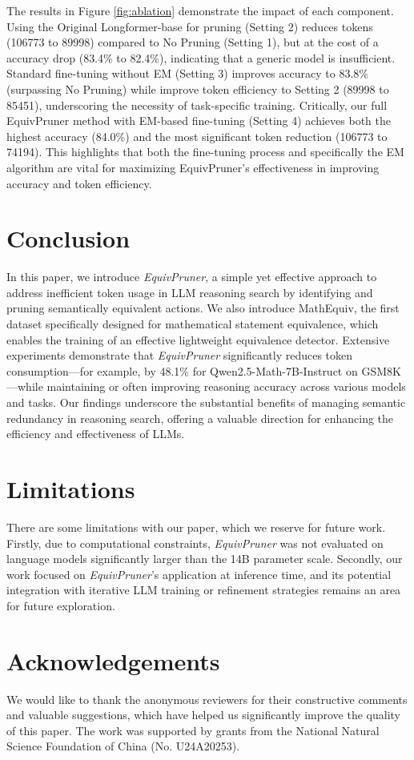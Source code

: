\documentclass[11pt]{article}
\begin{document}
The results in Figure \ref{fig:ablation} demonstrate the impact of each component. Using the Original Longformer-base for pruning (Setting 2) reduces tokens (106773 to 89998) compared to No Pruning (Setting 1), but at the cost of a accuracy drop (83.4\% to 82.4\%), indicating that a generic model is insufficient. Standard fine-tuning without EM (Setting 3) improves accuracy to 83.8\% (surpassing No Pruning) while improve token efficiency to Setting 2 (89998 to 85451), underscoring the necessity of task-specific training. Critically, our full EquivPruner method with EM-based fine-tuning (Setting 4) achieves both the highest accuracy (84.0\%) and the most significant token reduction (106773 to 74194). This highlights that both the fine-tuning process and specifically the EM algorithm are vital for maximizing EquivPruner's effectiveness in improving accuracy and token efficiency.
\section{Conclusion}
In this paper, we introduce \textit{EquivPruner}, a simple yet effective approach to address inefficient token usage in LLM reasoning search by identifying and pruning semantically equivalent actions. We also introduce MathEquiv, the first dataset specifically designed for mathematical statement equivalence, which enables the training of an effective lightweight equivalence detector. Extensive experiments demonstrate that \textit{EquivPruner} significantly reduces token consumption—for example, by 48.1\% for Qwen2.5-Math-7B-Instruct on GSM8K—while maintaining or often improving reasoning accuracy across various models and tasks. Our findings underscore the substantial benefits of managing semantic redundancy in reasoning search, offering a valuable direction for enhancing the efficiency and effectiveness of LLMs.
\section*{Limitations}
There are some limitations with our paper, which we reserve for future work.
Firstly, due to computational constraints, \textit{EquivPruner} was not evaluated on language models significantly larger than the 14B parameter scale. Secondly, our work focused on \textit{EquivPruner}'s application at inference time, and its potential integration with iterative LLM training or refinement strategies remains an area for future exploration.
\section*{Acknowledgements}
We would like to thank the anonymous reviewers for their constructive comments and valuable suggestions, which have helped us significantly improve the quality of this paper.
The work was supported by grants from the National Natural Science Foundation of China (No. U24A20253).
\end{document}

